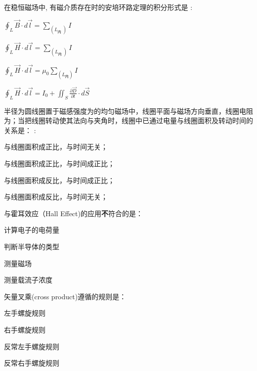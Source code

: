 \documentclass{njustexam}
\begin{document}
\begin{problem}
  在稳恒磁场中, 有磁介质存在时的安培环路定理的积分形式是 : 
  \begin{abcd}
    \item  $\oint_L \vec{B} \cdot d \vec{l}=\sum_{\left(L_{\text {内 }}\right)} I$
    \item  $\oint_L \vec{H} \cdot d \vec{l}=\sum_{\left(L_{\text {内 }}\right)} I$
    \item  $\oint_L \vec{H} \cdot d \vec{l}=\mu_0 \sum_{\left(L_内\right)} I$
    \item  $\oint_L \vec{H} \cdot d \vec{l}=I_0+\iint_S \frac{\partial \vec{D}}{\partial t} \cdot d \vec{S}$
  \end{abcd}

\end{problem}


\begin{problem}
  半径为圆线圈置于磁感强度为的均匀磁场中，线圈平面与磁场方向垂直，线圈电阻为；当把线圈转动使其法向与夹角时，线圈中已通过电量与线圈面积及转动时间的关系是： 
: 
  \begin{abcd}
    \item  与线圈面积成正比，与时间无关； 
    \item  与线圈面积成正比，与时间成正比；
    \item  与线圈面积成反比，与时间成正比；
    \item  与线圈面积成反比，与时间无关；
  \end{abcd}

\end{problem}




\begin{problem}

    与霍耳效应（Hall Effect)的应用\textbf{不}符合的是：
    \begin{abcd}
      \item 计算电子的电荷量
      \item 判断半导体的类型
      \item 测量磁场
      \item 测量载流子浓度
    \end{abcd}
\end{problem}


\begin{problem}

  矢量叉乘(cross product)遵循的规则是：
  \begin{abcd}
    \item 左手螺旋规则
    \item 右手螺旋规则
    \item 反常左手螺旋规则
    \item 反常右手螺旋规则
  \end{abcd}
\end{problem}
\end{document}
